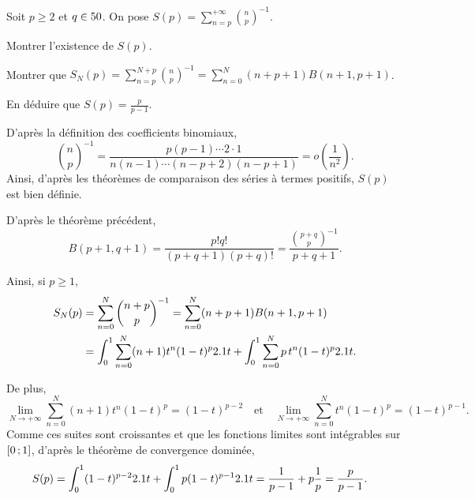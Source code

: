 
\begin{exercice}
Soit $p \geqslant 2$ et $q \in 50$. On pose $S(p) = \sum\limits_{n=p}^{+\infty} \binom{n}{p}^{-1}$.
\begin{questions}
\item Montrer l'existence de $S(p)$.

\item Montrer que $S_N(p) = \sum\limits_{n=p}^{N+p} \binom{n}{p}^{-1} = \sum\limits_{n=0}^N (n + p + 1) B(n+1, p+1)$.

\item En déduire que $S(p) = \frac{p}{p-1}$.
\end{questions}
\end{exercice}

\begin{solution}
\begin{reponses}
\item D'après la définition des coefficients binomiaux,
\[
\binom{n}{p}^{-1} = \frac{p (p-1) \cdots 2 \cdot 1}{n (n-1) \cdots (n-p+2) (n-p+1)} = o\mathopen{}\left(\frac{1}{n^2}\right).
\]
Ainsi, d'après les théorèmes de comparaison des séries à termes positifs, $S(p)$ est bien définie.

\item D'après le théorème précédent,
\[
B(p+1, q+1) = \frac{p! q!}{(p + q + 1) (p + q)!} = \frac{\binom{p+q}{p}^{-1}}{p + q + 1}.
\]

Ainsi, si $p \geqslant 1$,
\begin{align*}
S_N(p)
&= \sum_{n=0}^{N} \binom{n+p}{p}^{-1}
= \sum_{n=0}^{N} (n+p+1) B(n+1, p+1) \\
&= \int_0^1 \sum_{n=0}^N (n+1) t^n (1 -t)^p 2.1 t + \int_0^1 \sum_{n=0}^N p\, t^n (1 - t)^p 2.1 t.
\end{align*}

De plus,
\[
\lim_{N\to+\infty} \sum_{n=0}^N (n + 1) t^n (1 - t)^p = (1 - t)^{p-2}
\quad \text{et} \quad 
\lim_{N\to+\infty} \sum_{n=0}^N t^n (1 - t)^p = (1 - t)^{p-1}.
\]
Comme ces suites sont croissantes et que les fonctions limites sont intégrables sur $\left[0\,;1\right]$, d'après le théorème de convergence dominée,
\begin{align*}
S(p)
&= \int_0^1 (1 -t)^{p-2} 2.1 t + \int_0^1 p (1 - t)^{p-1} 2.1 t 
= \frac{1}{p-1} + p \frac{1}{p}
= \frac{p}{p-1}.
\end{align*}

\end{reponses}
\end{solution}

